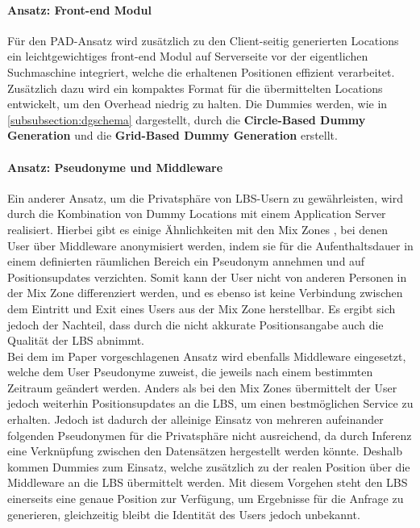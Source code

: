 \paragraph{Ansatz: Front-end Modul \cite{Lu2008}} \label{para:modul}
Für den PAD-Ansatz wird zusätzlich zu den Client-seitig generierten Locations ein leichtgewichtiges front-end Modul auf Serverseite vor der eigentlichen Suchmaschine integriert, welche die erhaltenen Positionen effizient verarbeitet. Zusätzlich dazu wird ein kompaktes Format für die übermittelten Locations entwickelt, um den Overhead niedrig zu halten. Die Dummies werden, wie in \ref{subsubsection:dgschema} dargestellt, durch die \textbf{Circle-Based Dummy Generation} und die \textbf{Grid-Based Dummy Generation} erstellt.

\paragraph{Ansatz: Pseudonyme und Middleware \cite{Sahu2012}} \label{para:middle}
Ein anderer Ansatz, um die Privatsphäre von LBS-Usern zu gewährleisten, wird durch die Kombination von Dummy Locations mit einem Application Server realisiert. Hierbei gibt es einige Ähnlichkeiten mit den Mix Zones \cite{Beresford2003}, bei denen User über Middleware anonymisiert werden, indem sie für die Aufenthaltsdauer in einem definierten räumlichen Bereich ein Pseudonym annehmen und auf Positionsupdates verzichten. Somit kann der User nicht von anderen Personen in der Mix Zone differenziert werden, und es ebenso ist keine Verbindung zwischen dem Eintritt und Exit eines Users aus der Mix Zone herstellbar. Es ergibt sich jedoch der Nachteil, dass durch die nicht akkurate Positionsangabe auch die Qualität der LBS abnimmt.\\
Bei dem im Paper vorgeschlagenen Ansatz wird ebenfalls Middleware eingesetzt, welche dem User Pseudonyme zuweist, die jeweils nach einem bestimmten Zeitraum geändert werden. Anders als bei den Mix Zones übermittelt der User jedoch weiterhin Positionsupdates an die LBS, um einen bestmöglichen Service zu erhalten. Jedoch ist dadurch der alleinige Einsatz von mehreren aufeinander folgenden Pseudonymen für die Privatsphäre nicht ausreichend, da durch Inferenz eine Verknüpfung zwischen den Datensätzen hergestellt werden könnte. Deshalb kommen Dummies zum Einsatz, welche zusätzlich zu der realen Position über die Middleware an die LBS übermittelt werden. Mit diesem Vorgehen steht den LBS einerseits eine genaue Position zur Verfügung, um Ergebnisse für die Anfrage zu generieren, gleichzeitig bleibt die Identität des Users jedoch unbekannt.

